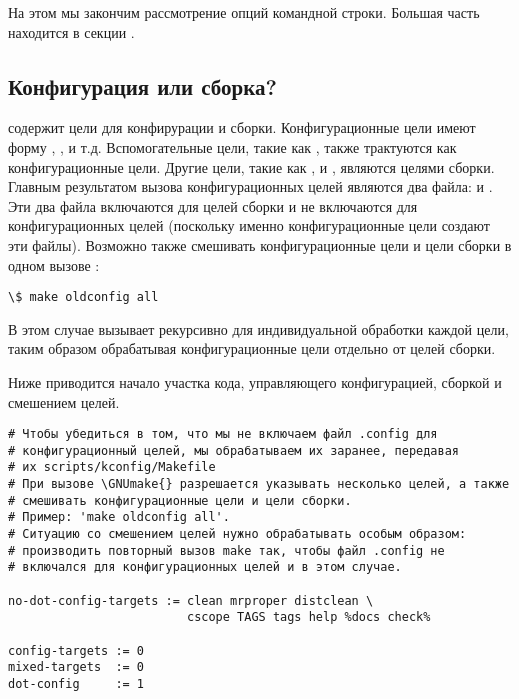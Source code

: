 На этом мы закончим рассмотрение опций командной строки. Большая часть
 находится в секции .

\subsection{Конфигурация или сборка?}
\Makefile{} содержит цели для конфирурации и сборки. Конфигурационные
цели имеют форму , , и
т.д. Вспомогательные цели, такие как , также трактуются
как конфигурационные цели. Другие цели, такие как ,
 и , являются целями сборки. Главным
результатом вызова конфигурационных целей являются два файла:
 и . Эти два файла включаются
 для целей сборки и не включаются для конфигурационных
целей (поскольку именно конфигурационные цели создают эти
файлы). Возможно также смешивать конфигурационные цели и цели сборки в
одном вызове \GNUmake{}:

\begin{verbatim}
\$ make oldconfig all
\end{verbatim}

В этом случае \Makefile{} вызывает \GNUmake{} рекурсивно для
индивидуальной обработки каждой цели, таким образом обрабатывая
конфигурационные цели отдельно от целей сборки.

Ниже приводится начало участка кода, управляющего конфигурацией,
сборкой и смешением целей.

\begin{verbatim}
# Чтобы убедиться в том, что мы не включаем файл .config для
# конфигурационный целей, мы обрабатываем их заранее, передавая
# их scripts/kconfig/Makefile
# При вызове \GNUmake{} разрешается указывать несколько целей, а также
# смешивать конфигурационные цели и цели сборки.
# Пример: 'make oldconfig all'.
# Ситуацию со смешением целей нужно обрабатывать особым образом:
# производить повторный вызов make так, чтобы файл .config не
# включался для конфигурационных целей и в этом случае.

no-dot-config-targets := clean mrproper distclean \
                         cscope TAGS tags help %docs check%

config-targets := 0
mixed-targets  := 0
dot-config     := 1
\end{verbatim}

